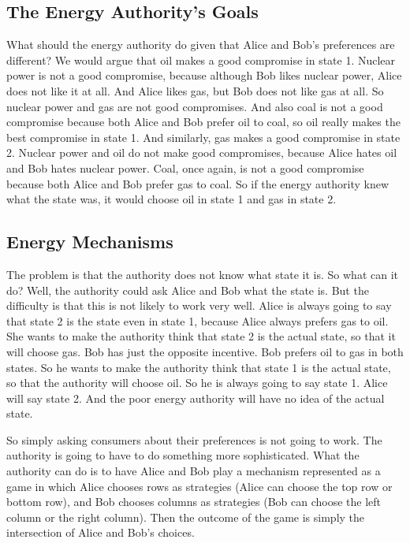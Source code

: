 \documentclass[12pt,a4paper]{article}
\newenvironment{original}{%
  \par\vspace{4pt}\noindent%
  \color{black}%
  \ignorespaces
}{%
  \par\vspace{2pt}%
}
\begin{document}
\begin{original}
\subsection*{The Energy Authority's Goals}
What should the energy authority do given that Alice and Bob's preferences are different? We would argue that oil makes a good compromise in state 1. Nuclear power is not a good compromise, because although Bob likes nuclear power, Alice does not like it at all. And Alice likes gas, but Bob does not like gas at all. So nuclear power and gas are not good compromises. And also coal is not a good compromise because both Alice and Bob prefer oil to coal, so oil really makes the best compromise in state 1. And similarly, gas makes a good compromise in state 2. Nuclear power and oil do not make good compromises, because Alice hates oil and Bob hates nuclear power. Coal, once again, is not a good compromise because both Alice and Bob prefer gas to coal. So if the energy authority knew what the state was, it would choose oil in state 1 and gas in state 2.

\subsection*{Energy Mechanisms}
The problem is that the authority does not know what state it is. So what can it do? Well, the authority could ask Alice and Bob what the state is. But the difficulty is that this is not likely to work very well. Alice is always going to say that state 2 is the state even in state 1, because Alice always prefers gas to oil. She wants to make the authority think that state 2 is the actual state, so that it will choose gas. Bob has just the opposite incentive. Bob prefers oil to gas in both states. So he wants to make the authority think that state 1 is the actual state, so that the authority will choose oil. So he is always going to say state 1. Alice will say state 2. And the poor energy authority will have no idea of the actual state.

So simply asking consumers about their preferences is not going to work. The authority is going to have to do something more sophisticated. What the authority can do is to have Alice and Bob play a mechanism represented as a game in which Alice chooses rows as strategies (Alice can choose the top row or bottom row), and Bob chooses columns as strategies (Bob can choose the left column or the right column). Then the outcome of the game is simply the intersection of Alice and Bob's choices.


\end{original}
\end{document}

